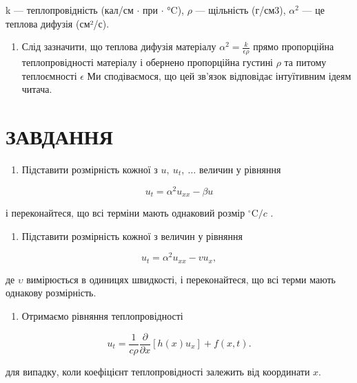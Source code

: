 \documentclass[
  ukrainian,
]{article}
\providecommand{\tightlist}{%
  \setlength{\itemsep}{0pt}\setlength{\parskip}{0pt}}
\begin{document}
k --- теплопровідність (кал/см \(\cdot\) при \(\cdot\) °C), \(\rho\) ---
щільність (г/см3), \(\alpha^2\) --- це теплова дифузія (см²/с).

\begin{enumerate}
\def\labelenumi{\arabic{enumi}.}
\setcounter{enumi}{3}
\tightlist
\item
  Слід зазначити, що теплова дифузія матеріалу
  \(\alpha^2 = \frac{k}{\epsilon \rho}\) прямо пропорційна
  теплопровідності матеріалу і обернено пропорційна густині \(\rho\) та
  питому теплоємності \(\epsilon\) Ми сподіваємося, що цей зв'язок
  відповідає інтуїтивним ідеям читача.
\end{enumerate}

\section{ЗАВДАННЯ}\label{ux437ux430ux432ux434ux430ux43dux43dux44f-3}

\begin{enumerate}
\def\labelenumi{\arabic{enumi}.}
\tightlist
\item
  Підставити розмірність кожної з \(u,\ u_t,\ \dots\) величин у рівняння
\end{enumerate}

\[
u_t = \alpha^2 u_{xx} - \beta u
\]

і переконайтеся, що всі терміни мають однаковий розмір
\({}^{\circ}\mathrm{C}/c\) .

\begin{enumerate}
\def\labelenumi{\arabic{enumi}.}
\setcounter{enumi}{1}
\tightlist
\item
  Підставити розмірність кожної з величин у рівняння
\end{enumerate}

\[
u_t = \alpha^2 u_{xx} - v u_x,
\]

де \(\upsilon\) вимірюється в одиницях швидкості, і переконайтеся, що
всі терми мають однакову розмірність.

\begin{enumerate}
\def\labelenumi{\arabic{enumi}.}
\setcounter{enumi}{2}
\tightlist
\item
  Отримаємо рівняння теплопровідності
\end{enumerate}

\[
u_t = \frac{1}{c\rho}\frac{\partial}{\partial x}\left[h(x)u_x\right] + f(x,t).
\]

для випадку, коли коефіцієнт теплопровідності залежить від координати
\(x\).
\end{document}
